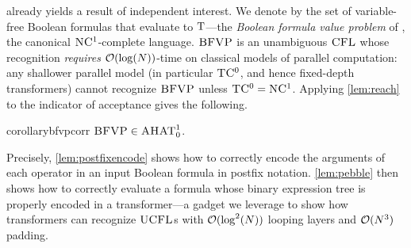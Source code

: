 \documentclass{article}
\begin{document}
 already yields a result of independent interest.
We denote by  the set of variable-free Boolean formulas that evaluate to ${\mathbin{\mathrm{T}}}$---the \emph{Boolean formula value problem} of \citet{buss-bfvp}, the canonical ${\textsc{NC}\textsuperscript{1}}$-complete language.
${\textsc{BFVP}}$ is an unambiguous ${\textsc{CFL}}$ whose recognition \emph{requires} ${{ \mathcal{O}}}(\log({{ N}}))$-time on classical models of parallel computation: any shallower parallel model (in particular ${\textsc{TC}\textsuperscript{0}}$, and hence fixed-depth transformers) cannot recognize ${\textsc{BFVP}}$ unless ${\textsc{TC}\textsuperscript{0}} = {\textsc{NC}\textsuperscript{1}}$.
Applying \cref{lem:reach} to the indicator of acceptance gives the following.
\begin{restatable}{corollary}{bfvpcorr}\label{corr:bfvp}
${\textsc{BFVP}} \in {{\textsc{AHAT}}}^1_0$.
\end{restatable}
Precisely, \cref{lem:postfixencode} shows how to correctly encode the arguments of each operator in an input Boolean formula in postfix notation.
\cref{lem:pebble} then shows how to correctly evaluate a formula whose binary expression tree is properly encoded in a transformer---a gadget we leverage to show how transformers can recognize ${\textsc{UCFL}}$s with ${{ \mathcal{O}}}(\log^2({{ N}}))$ looping layers and ${{ \mathcal{O}}}({{ N}}^3)$ padding.
\ucfltoahat*
\end{document}
